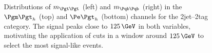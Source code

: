 \begin{figure}
\begin{center}

\end{center}
\caption[Distributions of $m_{\Pgt\Pgt}$ (left) and $m_{\Pqb\Pqb}$ (right) in the $\mutau$ (top) and
$\etau$ (bottom) channels for the 2jet--2tag category.]{
Distributions of $m_{\Pgt\Pgt}$ (left) and $m_{\Pqb\Pqb}$ (right) in the $\mutau$ (top) and
$\etau$ (bottom) channels for the 2jet--2tag category. The signal peaks close to
$125\,\GeV$ in both variables, motivating the application of cuts in a window
around $125\,\GeV$ to select the most signal-like events.}
\label{fig:2jet2tagmttmbb}
\end{figure} 

